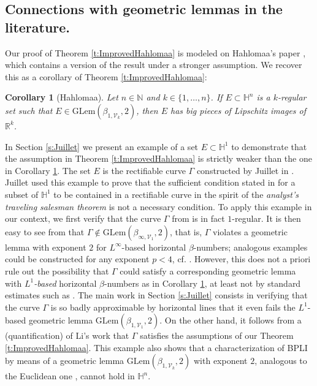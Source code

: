 \documentclass[12pt]{amsart}
\renewcommand{\H}{\mathbb H}
\numberwithin{equation}{section}
\theoremstyle{plain}
\newtheorem{corollary}[theorem]{Corollary}
\theoremstyle{definition}
\theoremstyle{remark}
\begin{document}
\subsection*{Connections with geometric lemmas in the literature.} Our proof of Theorem \ref{t:ImprovedHahlomaa} is modeled on Hahlomaa's paper \cite{Hahlomaa}, which contains a version of the result under a stronger assumption. We recover this as a corollary  of Theorem \ref{t:ImprovedHahlomaa}:
\begin{corollary}[Hahlomaa]\label{c:HahlomaaWithHorizontal}
         Let $n\in \mathbb{N}$ and $k\in \{1,\ldots,n\}$. If $E\subset \mathbb{H}^n$ is a $k$-regular set such that $E\in \mathrm{GLem}(\beta_{1,\mathcal{V}_k},2)$, then $E$ has big pieces of Lipschitz images of $\mathbb{R}^k$. 
    \end{corollary}
In Section \ref{s:Juillet} we present an example of a set $E\subset \mathbb{H}^1$ to demonstrate that the assumption in  Theorem \ref{t:ImprovedHahlomaa}  is strictly weaker than the one in Corollary \ref{c:HahlomaaWithHorizontal}. The set $E$ is the rectifiable curve $\Gamma$ constructed by Juillet in \cite{Juillet}. Juillet used this example to prove that the 
sufficient condition stated in \cite{MR2371434} for a subset of $\mathbb{H}^1$ to be contained in a rectifiable curve in the spirit of the \emph{analyst's traveling salesman theorem} is not a necessary condition. To apply this example in our context, we first verify that the curve $\Gamma$ from \cite{Juillet} is in fact $1$-regular. It is then easy to see from \cite{Juillet} that $\Gamma \notin \mathrm{GLem}(\beta_{\infty,\mathcal{V}_1},2)$, that is, $\Gamma$ violates a geometric lemma with exponent $2$ for $L^{\infty}$-based horizontal  $\beta$-numbers; analogous examples could be constructed for any exponent $p<4$, cf. \cite{Li}. However, this does not a priori rule out the possibility that $\Gamma$ could satisfy a corresponding geometric lemma with \emph{$L^1$-based} horizontal $\beta$-numbers as in Corollary \ref{c:HahlomaaWithHorizontal}, at least not by standard estimates such as \cite[(5.4)]{David1}. The main work in Section \ref{s:Juillet} consists in verifying that the curve $\Gamma$ is so badly approximable by horizontal lines that it even fails the $L^1$-based geometric lemma $\mathrm{GLem}(\beta_{1,\mathcal{V}_1},2)$. On the other hand, it follows from a (quantification) of Li's work \cite{Li}  that $\Gamma$ satisfies the assumptions of our Theorem \ref{t:ImprovedHahlomaa}.
This example also shows that a characterization of BPLI by means of a geometric lemma $\mathrm{GLem}(\beta_{1,\mathcal V_k},2)$ with exponent $2$, analogous to the Euclidean one \cite{David1}, cannot hold in $\H^n$.
\end{document}
